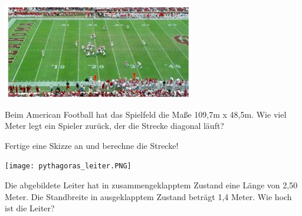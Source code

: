 \begin{minipage}{0.4 \textwidth}
    \includegraphics[scale=0.7]{bilder/spielfeld_american_football.png}
\end{minipage}%
\begin{minipage}{0.55 \textwidth}
    Beim American Football hat das Spielfeld die Maße 109,7m x 48,5m. Wie viel Meter legt ein Spieler zurück, der die Strecke diagonal läuft? 
    
    Fertige eine Skizze an und berechne die Strecke!
\end{minipage}

\droptotalpoints
\newpage
\question[4]
\begin{minipage}{0.4\textwidth}
    \texttt{[image: pythagoras\_leiter.PNG]}
\end{minipage}%
\begin{minipage}[b]{0.5\textwidth}
    Die abgebildete Leiter hat in zusammengeklapptem Zustand eine Länge von 2,50 Meter. Die Standbreite in ausgeklapptem Zustand beträgt 1,4 Meter. Wie hoch ist die Leiter?
\end{minipage}

\droptotalpoints
\question

